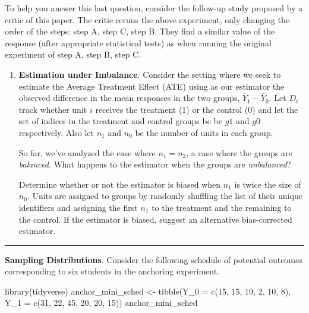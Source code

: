 \documentclass[
  letterpaper,
  DIV=11,
  numbers=noendperiod]{scrartcl}
\newenvironment{Shaded}{\begin{snugshade}}{\end{snugshade}}
\newcommand{\AttributeTok}[1]{\textcolor[rgb]{0.40,0.45,0.13}{#1}}
\newcommand{\DecValTok}[1]{\textcolor[rgb]{0.68,0.00,0.00}{#1}}
\newcommand{\FunctionTok}[1]{\textcolor[rgb]{0.28,0.35,0.67}{#1}}
\newcommand{\NormalTok}[1]{\textcolor[rgb]{0.00,0.23,0.31}{#1}}
\newcommand{\OtherTok}[1]{\textcolor[rgb]{0.00,0.23,0.31}{#1}}
\begin{document}
\begin{enumerate}
  To help you answer this last question, consider the follow-up study
  proposed by a critic of this paper. The critic reruns the above
  experiment, only changing the order of the steps: step A, step C, step
  B. They find a similar value of the response (after appropriate
  statistical tests) as when running the original experiment of step A,
  step B, step C.
\end{enumerate}

\newpage{}

\begin{enumerate}
\def\labelenumi{\arabic{enumi}.}
\setcounter{enumi}{2}
\item
  \textbf{Estimation under Imbalance}. Consider the setting where we
  seek to estimate the Average Treatment Effect (ATE) using as our
  estimator the observed difference in the mean responses in the two
  groups, \(\overline{Y}_1 - \overline{Y}_0\). Let \(D_i\) track whether
  unit \(i\) receives the treatment (1) or the control (0) and let the
  set of indices in the treatment and control groups be be \(g1\) and
  \(g0\) respectively. Also let \(n_1\) and \(n_0\) be the number of
  units in each group.

  So far, we've analyzed the case where \(n_1 = n_2\), a case where the
  groups are \emph{balanced}. What happens to the estimator when the
  groups are \emph{unbalanced}?

  Determine whether or not the estimator is biased when \(n_1\) is twice
  the size of \(n_0\). Units are assigned to groups by randomly
  shuffling the list of their unique identifiers and assigning the first
  \(n_1\) to the treatment and the remaining to the control. If the
  estimator is biased, suggest an alternative bias-corrected estimator.
\end{enumerate}

\newpage{}

\begin{center}\rule{0.5\linewidth}{0.5pt}\end{center}

\textbf{Sampling Distributions}. Consider the following schedule of
potential outcomes corresponding to six students in the anchoring
experiment.

\begin{Shaded}
\begin{Highlighting}[]
\FunctionTok{library}\NormalTok{(tidyverse)}
\NormalTok{anchor\_mini\_sched }\OtherTok{\textless{}{-}} \FunctionTok{tibble}\NormalTok{(}\AttributeTok{Y\_0 =} \FunctionTok{c}\NormalTok{(}\DecValTok{15}\NormalTok{, }\DecValTok{15}\NormalTok{, }\DecValTok{19}\NormalTok{, }\DecValTok{2}\NormalTok{, }\DecValTok{10}\NormalTok{, }\DecValTok{8}\NormalTok{),}
                            \AttributeTok{Y\_1 =} \FunctionTok{c}\NormalTok{(}\DecValTok{31}\NormalTok{, }\DecValTok{22}\NormalTok{, }\DecValTok{45}\NormalTok{, }\DecValTok{20}\NormalTok{, }\DecValTok{20}\NormalTok{, }\DecValTok{15}\NormalTok{))}
\NormalTok{anchor\_mini\_sched}
\end{Highlighting}
\end{Shaded}
\end{document}

